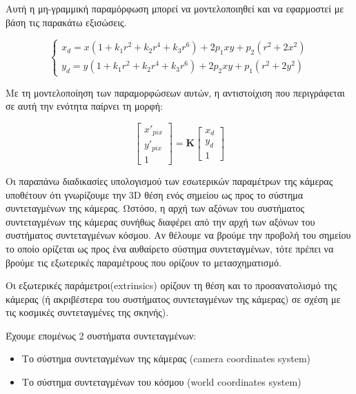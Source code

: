 Αυτή η μη-γραμμική παραμόρφωση μπορεί να μοντελοποιηθεί και να εφαρμοστεί με βάση τις παρακάτω εξισώσεις. 



\begin{equation}
\begin{cases}x_{d}=x(1+k_{1}r^{2}+k_{2}r^{4}+k_{3}r^{6})+2p_{1}xy+p_{2}(r^{2}+2x^{2})\\
y_{d}=y(1+k_{1}r^{2}+k_{2}r^{4}+k_{3}r^{6})+2p_{2}xy+p_{1}(r^{2}+2y^{2})\end{cases}
\end{equation}

Με τη μοντελοποίηση των παραμορφώσεων αυτών, η αντιστοίχιση που περιγράφεται σε αυτή την ενότητα παίρνει τη μορφή:


\begin{equation}
\begin{bmatrix}
x'_{pix}\\y'_{pix}\\1
\end{bmatrix}
=
\mathbf{K}
\begin{bmatrix}
x_{d}\\
y_{d}\\
1
\end{bmatrix}
\end{equation}





Οι παραπάνω διαδικασίες υπολογισμού των εσωτερικών παραμέτρων της κάμερας υποθέτουν ότι γνωρίζουμε την 3D θέση ενός σημείου ως προς το σύστημα συντεταγμένων της κάμερας. Ωστόσο, η αρχή των αξόνων του συστήματος συντεταγμένων της κάμερας συνήθως διαφέρει από την αρχή των αξόνων του συστήματος συντεταγμένων κόσμου. Αν θέλουμε να βρούμε την προβολή του σημείου το οποίο ορίζεται ως προς ένα αυθαίρετο σύστημα συντεταγμένων, τότε πρέπει να βρούμε τις εξωτερικές παραμέτρους που ορίζουν το μετασχηματισμό. 


Οι εξωτερικές παράμετροι(extrinsics) ορίζουν τη θέση και το προσανατολισμό της κάμερας (ή ακριβέστερα του συστήματος συντεταγμένων της κάμερας) σε σχέση με τις κοσμικές συντεταγμένες της σκηνής). 

Έχουμε επομένως 2 συστήματα συντεταγμένων:

\begin{itemize}
\item Το σύστημα συντεταγμένων της κάμερας (camera coordinates system)
\item Το σύστημα συντεταγμένων του κόσμου (world coordinates system)
\end{itemize}



